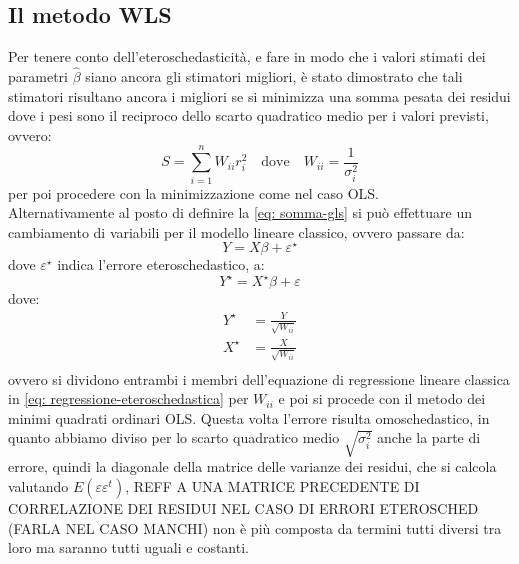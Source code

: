 \subsection{Il metodo WLS}
Per tenere conto dell'eteroschedasticità, e fare in modo che i valori stimati dei parametri $\hat{\beta}$ siano ancora gli stimatori migliori, è stato dimostrato che tali stimatori risultano ancora i migliori se si minimizza una somma pesata dei residui dove i pesi sono il reciproco dello scarto quadratico medio per i valori previsti, ovvero:
\begin{equation}
S = \sum_{i=1}^{n} W_{ii} r_i^2 \quad \text{dove}\quad W_{ii} = \frac{1}{\sigma_i^2} 
\label{eq: somma-gls}
\end{equation}
per poi procedere con la minimizzazione come nel caso OLS. \\
Alternativamente al posto di definire la \eqref{eq: somma-gls} si può effettuare un cambiamento di variabili per il modello lineare classico, ovvero passare da:
\begin{equation}
Y = X\beta + \varepsilon^\star
\label{eq: regressione-lineare-eterosched}
\end{equation} 
dove $\varepsilon^\star$ indica l'errore eteroschedastico, a:
\begin{equation}
Y^\star = X^\star\beta + \varepsilon
\label{eq: regressione-eteroschedatica}
\end{equation}
dove:
\begin{equation}
\begin{split}
Y^\star &= \frac{Y}{\sqrt{W_{ii}}} \\
X^\star &= \frac{X}{\sqrt{W_{ii}}} \\
\end{split}
\end{equation}
ovvero si dividono entrambi i membri dell'equazione di regressione lineare classica in \eqref{eq: regressione-eteroschedastica} per $W_{ii}$ e poi si procede con il metodo dei minimi quadrati ordinari OLS. Questa volta l'errore risulta omoschedastico, in quanto abbiamo diviso per lo scarto quadratico medio $\sqrt{\sigma_i^2}$ anche la parte di errore, quindi la diagonale della matrice delle varianze dei residui, che si calcola valutando $E(\varepsilon \varepsilon^t)$, REFF A UNA MATRICE PRECEDENTE DI CORRELAZIONE DEI RESIDUI NEL CASO DI ERRORI ETEROSCHED (FARLA NEL CASO MANCHI) non è più composta da termini tutti diversi tra loro ma saranno tutti uguali e costanti.
